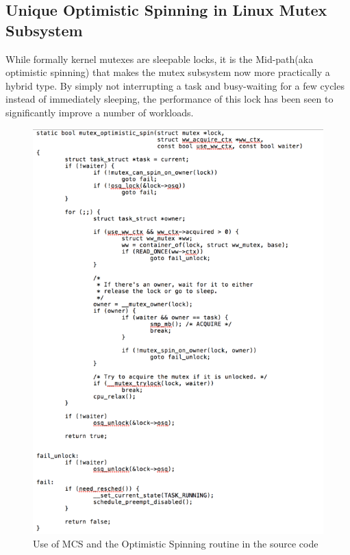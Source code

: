 \documentclass[10pt]{sigplanconf}
\begin{document}
\subsection{Unique Optimistic Spinning in Linux Mutex Subsystem}
While formally kernel mutexes are sleepable locks, it is the Mid-path(aka optimistic spinning) that makes the mutex subsystem now more practically a hybrid type. By simply not interrupting a task and busy-waiting for a few cycles instead of immediately sleeping, the performance of this lock has been seen to significantly improve a number of workloads. \\

\begin{figure}[h!]
	\includegraphics[scale=0.95]{image02.png}
	\caption{Use of MCS and the Optimistic Spinning routine in the source code}
\end{figure}
\end{document}
